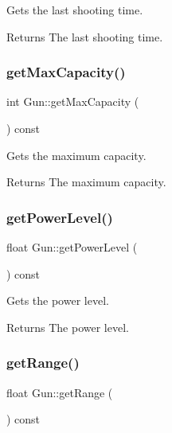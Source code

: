 Gets the last shooting time. 

\begin{DoxyReturn}{Returns}
The last shooting time. 
\end{DoxyReturn}
\mbox{\label{class_gun_a2fcce9b586802009705e7995a84bd0dc}} 
\subsubsection{\texorpdfstring{getMaxCapacity()}{getMaxCapacity()}}
{\footnotesize\ttfamily int Gun\+::get\+Max\+Capacity (\begin{DoxyParamCaption}{ }\end{DoxyParamCaption}) const\hspace{0.3cm}{\ttfamily [inline]}}



Gets the maximum capacity. 

\begin{DoxyReturn}{Returns}
The maximum capacity. 
\end{DoxyReturn}
\mbox{\label{class_gun_ac2b674cc15fc482a38174a418b51a443}} 
\subsubsection{\texorpdfstring{getPowerLevel()}{getPowerLevel()}}
{\footnotesize\ttfamily float Gun\+::get\+Power\+Level (\begin{DoxyParamCaption}{ }\end{DoxyParamCaption}) const\hspace{0.3cm}{\ttfamily [inline]}}



Gets the power level. 

\begin{DoxyReturn}{Returns}
The power level. 
\end{DoxyReturn}
\mbox{\label{class_gun_ae6e568c31cb8f7f5ecc5afbbdb796479}} 
\subsubsection{\texorpdfstring{getRange()}{getRange()}}
{\footnotesize\ttfamily float Gun\+::get\+Range (\begin{DoxyParamCaption}{ }\end{DoxyParamCaption}) const\hspace{0.3cm}{\ttfamily [inline]}}




